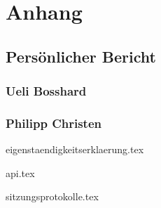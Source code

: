 \part{Anhang}

\chapter{Persönlicher Bericht}

\section{Ueli Bosshard}

\section{Philipp Christen}

{eigenstaendigkeitserklaerung.tex}

{api.tex}

{sitzungsprotokolle.tex}

